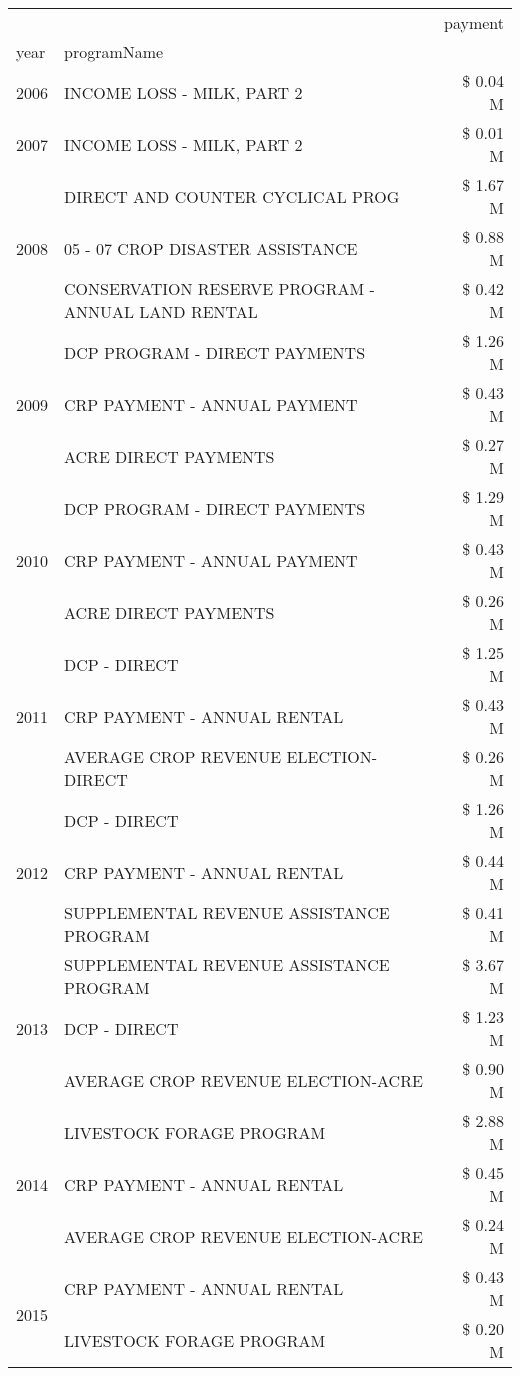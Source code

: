 \begin{tabular}{llr}
\toprule
 &  & payment \\
year & programName &  \\
\midrule
2006 & INCOME LOSS - MILK, PART 2 & \$ 0.04 M \\
\cline{1-3}
2007 & INCOME LOSS - MILK, PART 2 & \$ 0.01 M \\
\cline{1-3}
\multirow[t]{3}{*}{2008} & DIRECT AND COUNTER CYCLICAL PROG & \$ 1.67 M \\
 & 05 - 07 CROP DISASTER ASSISTANCE & \$ 0.88 M \\
 & CONSERVATION RESERVE PROGRAM - ANNUAL LAND RENTAL & \$ 0.42 M \\
\cline{1-3}
\multirow[t]{3}{*}{2009} & DCP PROGRAM - DIRECT PAYMENTS & \$ 1.26 M \\
 & CRP PAYMENT - ANNUAL PAYMENT & \$ 0.43 M \\
 & ACRE DIRECT PAYMENTS & \$ 0.27 M \\
\cline{1-3}
\multirow[t]{3}{*}{2010} & DCP PROGRAM - DIRECT PAYMENTS & \$ 1.29 M \\
 & CRP PAYMENT - ANNUAL PAYMENT & \$ 0.43 M \\
 & ACRE DIRECT PAYMENTS & \$ 0.26 M \\
\cline{1-3}
\multirow[t]{3}{*}{2011} & DCP - DIRECT & \$ 1.25 M \\
 & CRP PAYMENT - ANNUAL RENTAL & \$ 0.43 M \\
 & AVERAGE CROP REVENUE ELECTION-DIRECT & \$ 0.26 M \\
\cline{1-3}
\multirow[t]{3}{*}{2012} & DCP - DIRECT & \$ 1.26 M \\
 & CRP PAYMENT - ANNUAL RENTAL & \$ 0.44 M \\
 & SUPPLEMENTAL REVENUE ASSISTANCE PROGRAM & \$ 0.41 M \\
\cline{1-3}
\multirow[t]{3}{*}{2013} & SUPPLEMENTAL REVENUE ASSISTANCE PROGRAM & \$ 3.67 M \\
 & DCP - DIRECT & \$ 1.23 M \\
 & AVERAGE CROP REVENUE ELECTION-ACRE & \$ 0.90 M \\
\cline{1-3}
\multirow[t]{3}{*}{2014} & LIVESTOCK FORAGE PROGRAM & \$ 2.88 M \\
 & CRP PAYMENT - ANNUAL RENTAL & \$ 0.45 M \\
 & AVERAGE CROP REVENUE ELECTION-ACRE & \$ 0.24 M \\
\cline{1-3}
\multirow[t]{3}{*}{2015} & CRP PAYMENT - ANNUAL RENTAL & \$ 0.43 M \\
 & LIVESTOCK FORAGE PROGRAM & \$ 0.20 M \\

\end{tabular}
